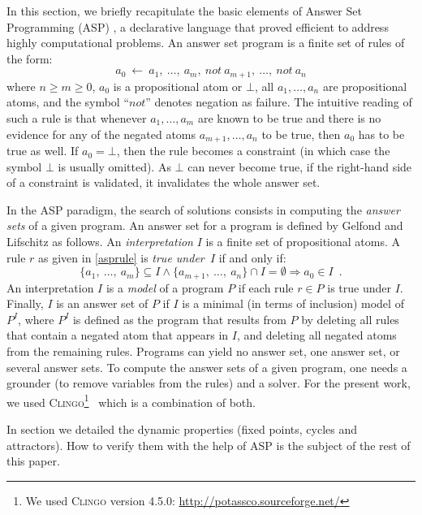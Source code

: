 In this section, we briefly recapitulate the basic elements of Answer Set Programming (ASP) \cite{baral2003knowledge}, a  declarative language that proved efficient to address highly computational problems. An answer set program is a finite set of rules of the form:
\begin{equation}
\label{asprule}
  a_{0}\ \leftarrow \ a_{1},\ \ldots,\ a_{m},\ not\ a_{m+1},\ \ldots,\ not\ a_{n}
\end{equation}
where $n \ge m \ge 0$, $a_{0}$ is a propositional atom or $\bot$, all
$a_{1}, \ldots ,a_{n}$ are propositional atoms, and the symbol ``$not$'' denotes  negation as failure.
The intuitive reading of such a rule is that whenever $a_{1}, \ldots, a_{m}$
are known to be true and there is no evidence for any of the negated atoms $a_{m+1}, \ldots, a_{n}$ to be true, then $a_{0}$ has to be true as well.
\label{constraint}
If $a_{0} = \bot$, then the rule becomes a constraint (in which case the symbol $\bot$ is usually omitted).
As $\bot$ can never become true, if the right-hand side of a constraint is validated, it invalidates the whole answer set.

In the ASP paradigm, the search of solutions consists in computing the \emph{answer sets} of a given program.
An answer set for a program is defined by Gelfond and Lifschitz \cite{DBLP:conf/iclp/GelfondL88} as follows.
An \emph{interpretation} $I$ is a finite set of propositional atoms.
A rule $r$ as given in \eqref{asprule} is \emph{true under~$I$} if and only if:
  \[\{a_1,\ \dots,\ a_{m}\} \subseteq I \wedge \{a_{m+1},\ \ldots,\ a_{n}\} \cap I = \emptyset \Rightarrow a_{0} \in I \enspace.\]
An interpretation $I$ is a \emph{model} of a program $P$ if each rule $r \in P$ is true under $I$.
Finally, $I$ is an answer set of $P$ if $I$ is a minimal (in terms of inclusion) model of $P^{I}$,
where $P^{I}$ is defined as the program that results from $P$ by deleting all rules that contain a negated atom that appears in $I$,
and deleting all negated atoms from the remaining rules.
Programs can yield no answer set, one answer set, or several answer sets.
To compute the answer sets of a given program, one needs a grounder (to remove variables from the rules) and a solver.
For the present work, we used \textsc{Clingo}\footnote{We used \textsc{Clingo} version 4.5.0: \url{http://potassco.sourceforge.net/}}~\cite{gebser2010incremental} which is a combination of both.

In section  we detailed the dynamic properties (fixed points, cycles and attractors). How to verify them with the help of ASP is the subject of the rest of this paper.
